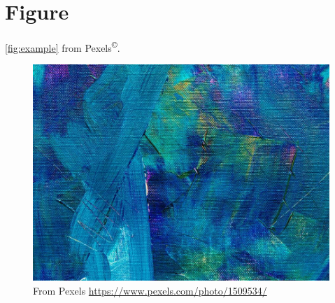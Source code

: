 \documentclass{report}
\let\oldurl\url
\renewcommand{\url}[1]{%
{\lmmono\oldurl{#1}}
}
\theoremstyle{definition}
\begin{document}
\newpage
\section{Figure}

\autoref{fig:example} from Pexels\textsuperscript{\copyright{}}.

\begin{figure}[htbp]
  \centering
  \includegraphics[scale=0.2]{pexels-1509534.jpg}
  \caption{From Pexels \url{https://www.pexels.com/photo/1509534/}}
  \label{fig:example}
\end{figure}
\end{document}
